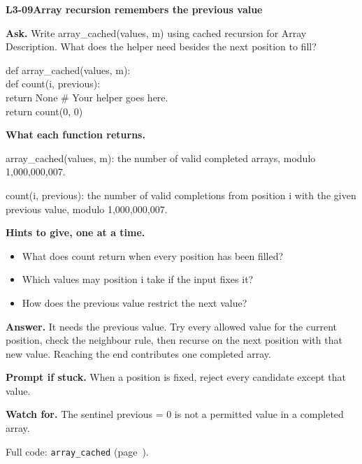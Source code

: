 \documentclass[11pt,a4paper]{article}
\begin{document}
\noindent\begin{minipage}{\textwidth}
{\color{teal}\textbf{L3-09}}\quad \textbf{Array recursion remembers the previous value}\par\smallskip
\textbf{Ask.} Write array\_cached(values, m) using cached recursion for Array Description. What does the helper need besides the next position to fill?\par\smallskip
\par{}\par\smallskip\noindent\colorbox{codepaper}{\parbox{\dimexpr\linewidth-2\fboxsep\relax}{\small\ttfamily\raggedright def array\_cached(values, m):\\\hspace*{2.4em}def count(i, previous):\\\hspace*{4.8em}return None  \# Your helper goes here.\\\hspace*{2.4em}return count(0, 0)}}\par
{\small\textbf{What each function returns.}\par array\_cached(values, m): the number of valid completed arrays, modulo 1,000,000,007.\par count(i, previous): the number of valid completions from position i with the given previous value, modulo 1,000,000,007.\par }
{\small\textbf{Hints to give, one at a time.}}\begin{itemize}\item What does count return when every position has been filled?\item Which values may position i take if the input fixes it?\item How does the previous value restrict the next value?\end{itemize}
\textbf{Answer.} It needs the previous value. Try every allowed value for the current position, check the neighbour rule, then recurse on the next position with that new value. Reaching the end contributes one completed array.\par\smallskip
\textbf{Prompt if stuck.} When a position is fixed, reject every candidate except that value.\par\smallskip
\textbf{Watch for.} The sentinel previous = 0 is not a permitted value in a completed array.\par\smallskip Full code: \texttt{array\_cached} (page~\pageref{L3-code-array_cached}).
\end{minipage}\par{}\medskip
\end{document}
